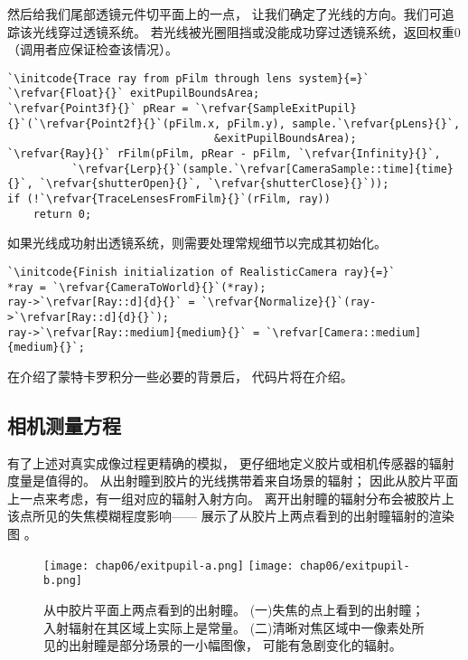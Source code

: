 然后给我们尾部透镜元件切平面上的一点，
让我们确定了光线的方向。我们可追踪该光线穿过透镜系统。
若光线被光圈阻挡或没能成功穿过透镜系统，返回权重0
（调用者应保证检查该情况）。
\begin{lstlisting}
`\initcode{Trace ray from pFilm through lens system}{=}`
`\refvar{Float}{}` exitPupilBoundsArea;
`\refvar{Point3f}{}` pRear = `\refvar{SampleExitPupil}{}`(`\refvar{Point2f}{}`(pFilm.x, pFilm.y), sample.`\refvar{pLens}{}`,
                                &exitPupilBoundsArea);
`\refvar{Ray}{}` rFilm(pFilm, pRear - pFilm, `\refvar{Infinity}{}`,
          `\refvar{Lerp}{}`(sample.`\refvar[CameraSample::time]{time}{}`, `\refvar{shutterOpen}{}`, `\refvar{shutterClose}{}`));
if (!`\refvar{TraceLensesFromFilm}{}`(rFilm, ray))
    return 0;
\end{lstlisting}

如果光线成功射出透镜系统，则需要处理常规细节以完成其初始化。
\begin{lstlisting}
`\initcode{Finish initialization of RealisticCamera ray}{=}`
*ray = `\refvar{CameraToWorld}{}`(*ray);
ray->`\refvar[Ray::d]{d}{}` = `\refvar{Normalize}{}`(ray->`\refvar[Ray::d]{d}{}`);
ray->`\refvar[Ray::medium]{medium}{}` = `\refvar[Camera::medium]{medium}{}`;
\end{lstlisting}

在介绍了蒙特卡罗积分一些必要的背景后，
代码片将在介绍。

\subsection{相机测量方程}\label{sub:相机测量方程}
有了上述对真实成像过程更精确的模拟，
更仔细地定义胶片或相机传感器的辐射度量是值得的。
从出射瞳到胶片的光线携带着来自场景的辐射；
因此从胶片平面上一点来考虑，有一组对应的辐射入射方向。
离开出射瞳的辐射分布会被胶片上该点所见的失焦模糊程度影响——
展示了从胶片上两点看到的出射瞳辐射的渲染图
。
\begin{figure}[htbp]
    \centering
    \texttt{[image: chap06/exitpupil-a.png]}\quad
    \texttt{[image: chap06/exitpupil-b.png]}
    \caption{从中胶片平面上两点看到的出射瞳。
        (一)失焦的点上看到的出射瞳；入射辐射在其区域上实际上是常量。
        (二)清晰对焦区域中一像素处所见的出射瞳是部分场景的一小幅图像，
        可能有急剧变化的辐射。}
    \label{fig:6.24}
\end{figure}

